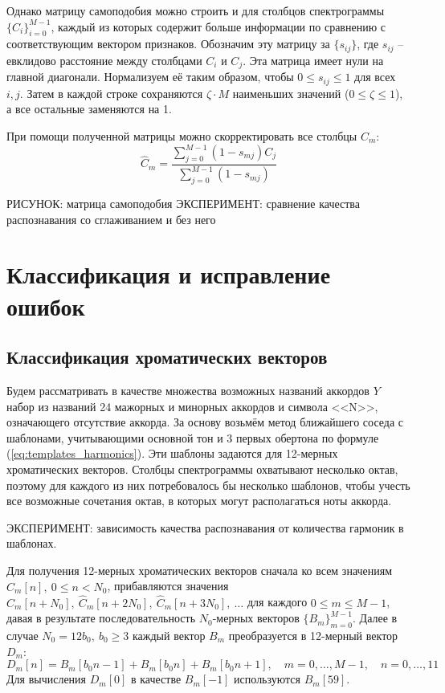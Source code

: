 Однако матрицу самоподобия можно строить и для столбцов спектрограммы
$\{C_i\}_{i=0}^{M-1}$, каждый из которых содержит больше информации по сравнению
с соответствующим вектором признаков. Обозначим эту матрицу за $\{s_{ij}\}$, где
$s_{ij}$ -- евклидово расстояние между столбцами $C_i$ и $C_j$. Эта матрица
имеет нули на главной диагонали. Нормализуем её таким образом, чтобы $0 \leq
s_{ij} \leq 1$ для всех $i, j$. Затем в каждой строке сохраняются $\zeta \cdot
M$ наименьших значений ($0 \leq \zeta \leq 1$), а все остальные заменяются на 1.

При помощи полученной матрицы можно скорректировать все столбцы $C_m$:
$$
\widehat{C}_m = \frac{\sum\limits_{j=0}^{M-1} (1 - s_{mj})
C_j}{\sum\limits_{j=0}^{M-1} (1 - s_{mj})} $$

РИСУНОК: матрица самоподобия
ЭКСПЕРИМЕНТ: сравнение качества распознавания со сглаживанием и без него


\section{Классификация и исправление ошибок} \label{sect1_class}

\subsection{Классификация хроматических векторов} \label{ssect1_chroma}

Будем рассматривать в качестве множества возможных названий аккордов $Y$ набор
из названий 24 мажорных и минорных аккордов и символа <<N>>, означающего
отсутствие аккорда. За основу возьмём метод ближайшего соседа с шаблонами,
учитывающими основной тон и 3 первых обертона по формуле
(\ref{eq:templates_harmonics}). Эти шаблоны задаются для 12-мерных хроматических
векторов. Столбцы спектрограммы охватывают несколько октав, поэтому для каждого
из них потребовалось бы несколько шаблонов, чтобы учесть все возможные
сочетания октав, в которых могут располагаться ноты аккорда.

ЭКСПЕРИМЕНТ: зависимость качества распознавания от количества гармоник в
шаблонах.

Для получения 12-мерных хроматических векторов сначала ко всем значениям
$\widehat{C}_m[n], ~ 0 \leq n < N_0$, прибавляются значения
$\widehat{C}_m[n+N_0], ~ \widehat{C}_m[n+2N_0], ~ \widehat{C}_m[n+3N_0], ~
\ldots$ для каждого $0 \leq m \leq M-1$, давая в результате последовательность
$N_0$-мерных векторов $\{B_m\}_{m=0}^{M-1}$. Далее в случае $N_0=12 b_0, ~ b_0
\geq 3$ каждый вектор $B_m$ преобразуется в 12-мерный вектор $D_m$:
$$ D_m[n] = B_m[b_0 n - 1] + B_m[b_0 n] + B_m[b_0 n + 1], \quad m=0,\dots,M-1,
\quad n=0,\dots,11 $$ 
Для вычисления $D_m[0]$ в качестве $B_m[-1]$ используются $B_m[59]$.

